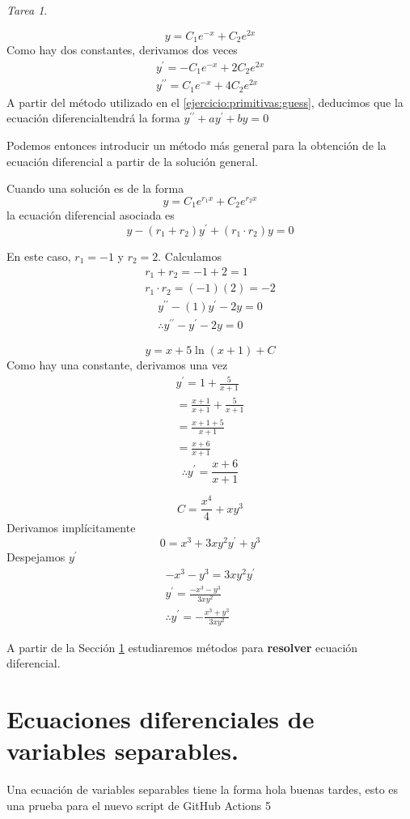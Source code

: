 \documentclass[12pt]{article} %
\theoremstyle{remark} %
\newtheorem{tarea}{Tarea}[section] %
\newcounter{ejercicio}[tarea]
\newcommand{\ed}{ecuación diferencial}
\begin{document}
\begin{tarea}
  \begin{ejercicio}[4]
    \[ y = C_1e^{-x} + C_2e^{2x} \]
    Como hay dos constantes, derivamos dos veces
    \begin{gather*}
      y^{\prime} = -C_1e^{-x} + 2C_2e^{2x}\\
      y^{\prime \prime} = C_1e^{-x} + 4C_2e^{2x}
    \end{gather*}
    A partir del método utilizado en el \cref{ejercicio:primitivas:guess}, deducimos que la \ed tendrá la forma 
    $y^{\prime \prime} + ay^{\prime} + by = 0$

    Podemos entonces introducir un método más general para la obtención de la ecuación diferencial a partir 
    de la solución general.

    Cuando una solución es de la forma \[ y = C_1e^{r_1x} + C_2e^{r_2x} \]
    la ecuación diferencial asociada es \[ y - (r_1 + r_2)y^{\prime} + (r_1 \cdot r_2)y = 0 \]

    En este caso, $r_1 = -1$ y $r_2 = 2$. Calculamos 
    \begin{gather*}
      r_1 + r_2 = -1 + 2 = 1\\
      r_1 \cdot r_2 = (-1)(2) = -2
    \end{gather*}
    \begin{gather*}
      y^{\prime \prime} -(1)y^{\prime} -2y = 0\\
      \therefore y^{\prime \prime} - y^{\prime} - 2y = 0
    \end{gather*}
  \end{ejercicio}
  \begin{ejercicio}[7]
    \[ y = x + 5 \ln(x+1) + C \]
    Como hay una constante, derivamos una vez
    \begin{gather*}
      y^{\prime} = 1 + \frac{5}{x+1}\\[0.5em]
      = \frac{x+1}{x+1} + \frac{5}{x+1}\\[0.5em]
      = \frac{x+1+5}{x+1}\\[0.5em]
      = \frac{x+6}{x+1}
    \end{gather*}
    \[ \therefore y^{\prime} = \frac{x+6}{x+1} \]
  \end{ejercicio}
  \begin{ejercicio}[9]
    \[ C = \frac{x^4}{4} + xy^{3} \]
    Derivamos implícitamente \[ 0 = x^3 + 3xy^2y^{\prime} + y^3 \]
    Despejamos $y^{\prime}$
    \begin{gather*}
      -x^3 - y^3 = 3xy^2y^{\prime}\\[0.5em]
      y^{\prime} = \frac{-x^3-y^3}{3xy^2}\\[0.5em]
      \therefore y^{\prime} = - \frac{x^3 + y^3}{3xy^2}
    \end{gather*}
  \end{ejercicio}
\end{tarea}
A partir de la Sección \ref{sec:variablesSeparables} estudiaremos métodos para \textbf{resolver} \ed .

\section{Ecuaciones diferenciales de variables separables.}
\label{sec:variablesSeparables}
Una ecuación de variables separables tiene la forma hola buenas tardes, esto es una prueba para el 
nuevo script de GitHub Actions 5
\end{document}
